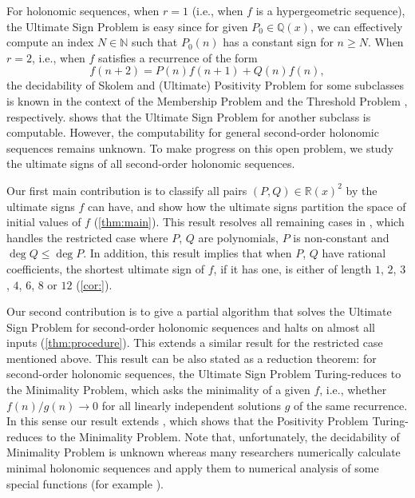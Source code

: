 \documentclass[a4paper,UKenglish,cleveref,autoref,thm-restate]{lipics-v2021}
\newcommand{\R}{\mathbb{R}}
\newcommand{\N}{\mathbb{N}}
\newcommand{\Q}{\mathbb{Q}}
\begin{document}
For holonomic sequences, when $r = 1$ (i.e., when $f$ is a hypergeometric sequence), the Ultimate Sign Problem is easy 
since for given $ P_0 \in \Q(x)$, 
we can effectively compute
an index $N \in \N$ such that $P_0(n)$ has a constant sign for $n \geq N$. 
When $r=2$, i.e., when $f$ satisfies a recurrence of the form
\begin{equation}\label{eq:(PQ)holonomic}
f(n+2) = P(n) f(n+1) + Q(n) f(n), 
\end{equation}
the decidability of Skolem and (Ultimate) Positivity Problem for 
some subclasses is known in the context of the Membership Problem \cite{NPSW22} and the Threshold Problem \cite{Ken24}, respectively. 
\cite[Theorem~7]{NOW21} shows that the Ultimate Sign Problem for another subclass is computable. However, the computability for general second-order holonomic sequences remains unknown. 
To make progress on this open problem, we study the ultimate signs of all second-order holonomic sequences. 

Our first main contribution is 
to classify all pairs $(P, Q) \in \R(x) ^2$ by the ultimate signs $f$ can have, 
and show how the ultimate signs partition the space of initial values of $f$ (\cref{thm:main}). This result resolves all remaining cases in \cite[Theorem~1]{NOW21}, which handles the 
restricted case where $P$, $Q$ are polynomials, $P$ is non-constant and $\deg Q \leq \deg P$. 
In addition, this result implies that when $P$, $Q$ have rational coefficients, 
the shortest ultimate sign of $f$, if it has one, is either of length $1$, $2$, $3$, $4$, $6$, $8$ or $12$ (\cref{cor:}). 

Our second contribution is to give a partial algorithm that
solves the Ultimate Sign Problem for second-order holonomic sequences 
and halts on almost all inputs (\cref{thm:procedure}). 
This extends a similar result \cite[Theorem~3]{NOW21} for the restricted case mentioned above. 
This result can be also stated as a reduction theorem: for second-order holonomic sequences, the Ultimate Sign Problem Turing-reduces to the Minimality Problem, which asks the minimality of a given $f$, i.e., whether $f(n) / g(n) \to 0$ for all linearly independent solutions $g$ of the same recurrence. 
In this sense our result extends \cite[Theorem~3.1]{KKL+21}, which shows that the Positivity Problem Turing-reduces to the Minimality Problem. 
Note that, unfortunately, the decidability of Minimality Problem is unknown whereas many researchers numerically calculate minimal holonomic sequences and apply them to numerical analysis of some special functions (for example \cite{Gau67,DST10}). 
\end{document}
